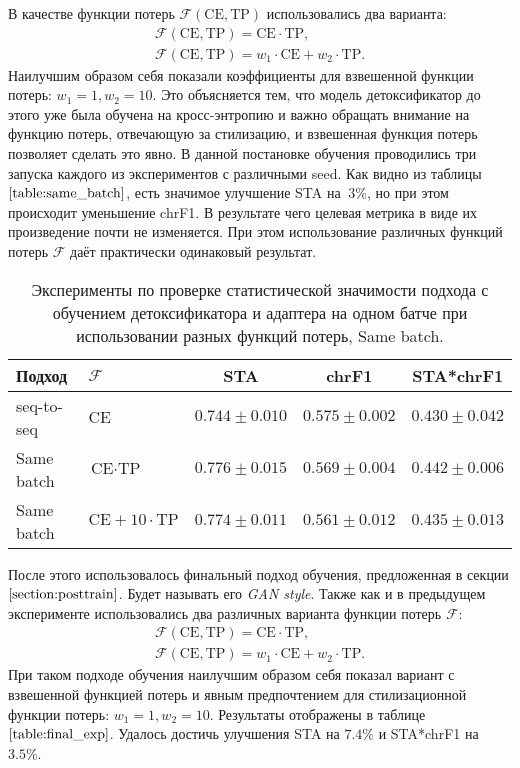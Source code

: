 В качестве функции потерь $\mathcal{F}(\text{CE}, \text{TP})$ использовались два варианта: 
\begin{gather*}
    \mathcal{F}(\text{CE}, \text{TP}) = \text{CE} \cdot \text{TP}, \\
    \mathcal{F}(\text{CE}, \text{TP}) = w_{1} \cdot \text{CE} + w_{2} \cdot \text{TP}. 
\end{gather*}
Наилучшим образом себя показали коэффициенты для взвешенной функции потерь: $w_1= 1, w_2 = 10$. Это объясняется тем, что модель детоксификатор до этого уже была обучена на кросс-энтропию и важно обращать внимание на функцию потерь, отвечающую за стилизацию, и взвешенная функция потерь позволяет сделать это явно.
В данной постановке обучения проводились три запуска каждого из экспериментов с различными seed.
Как видно из таблицы $\ref{table:same_batch}$, есть значимое улучшение STA на $~3\%$, но при этом происходит уменьшение chrF1. 
В результате чего целевая метрика в виде их произведение почти не изменяется.
При этом использование различных функций потерь $\mathcal{F}$ даёт практически одинаковый результат.   
\begin{table}[ht]
\centering
 \begin{tabular}{|l l|c c c|} 
 \hline
 Подход & $\mathcal{F}$ & STA & chrF1 & STA*chrF1 \\ [0.5ex] 
 \hline
 seq-to-seq & CE & $0.744 \pm 0.010$ & $0.575 \pm 0.002$ & $0.430 \pm 0.042$ \\ 
 Same batch & $\text{CE} \cdot \text{TP}$ & $0.776 \pm 0.015$ & $0.569 \pm 0.004$ & $0.442 \pm 0.006$ \\
 Same batch & $\text{CE} + 10 \cdot \text{TP}$ & $0.774 \pm 0.011$ & $0.561 \pm 0.012$ & $0.435 \pm 0.013$ \\
  \hline
 \end{tabular}
\caption{Эксперименты по проверке статистической значимости подхода с обучением детоксификатора и адаптера на одном батче при использовании разных функций потерь, Same batch.}
\label{table:same_batch}
\end{table}

После этого использовалось финальный подход обучения, предложенная в секции $\ref{section:posttrain}$.
Будет называть его \textit{GAN style}.
Также как и в предыдущем эксперименте использовались два различных варианта функции потерь $\mathcal{F}$:
\begin{gather*}
    \mathcal{F}(\text{CE}, \text{TP}) = \text{CE} \cdot \text{TP}, \\
    \mathcal{F}(\text{CE}, \text{TP}) = w_{1} \cdot \text{CE} + w_{2} \cdot \text{TP}. 
\end{gather*}
При таком подходе обучения наилучшим образом себя показал вариант с взвешенной функцией потерь и явным предпочтением для стилизационной функции потерь: $w_{1} = 1, w_{2} = 10$. 
Результаты отображены в таблице $\ref{table:final_exp}$.
Удалось достичь улучшения STA на $7.4\%$ и STA*chrF1 на $3.5\%$.


